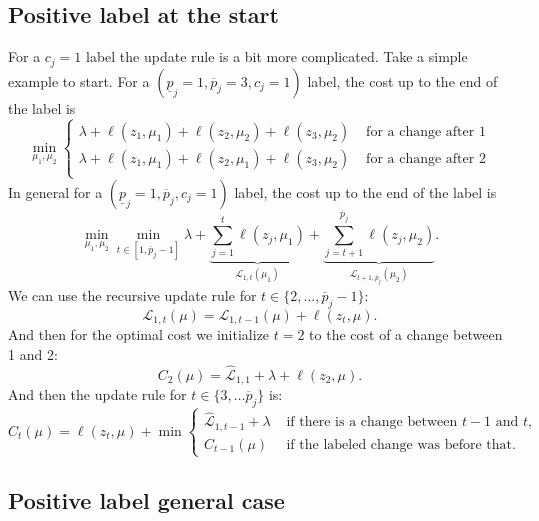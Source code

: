 \documentclass{article}
\begin{document}
\subsection{Positive label at the start}
For a $c_j=1$ label the update rule is a bit more complicated. Take a
simple example to start. For a
$(\underline p_j=1,\overline p_j=3,c_j=1)$ label, the cost up to the
end of the label is
\begin{equation}
  \label{eq:positive_cost}
  \min_{\mu_1, \mu_2}
  \begin{cases}
    \lambda+\ell(z_1,\mu_1) + \ell(z_2, \mu_2)+\ell(z_3, \mu_2) &\text{ for a
      change after 1}\\
    \lambda+\ell(z_1,\mu_1) + \ell(z_2, \mu_1)+\ell(z_3, \mu_2) &\text{ for a
      change after 2}\\
  \end{cases}
\end{equation}
In general for a
$(\underline p_j=1,\overline p_j,c_j=1)$ label, the cost up to the end
of the label is
\begin{equation}
  \label{eq:positive_cost}
  \min_{\mu_1, \mu_2}
  \min_{t\in[1, \overline p_j-1]}
\lambda+
  \underbrace{
    \sum_{j=1}^t \ell(z_j, \mu_1)
  }_{\mathcal L_{1,t}(\mu_1)}+
  \underbrace{
    \sum_{j=t+1}^{\overline p_j}\ell(z_j, \mu_2)
  }_{\mathcal L_{t+1,\overline p_j}(\mu_2)}.
\end{equation}
We can use the recursive update rule for $t\in\{2,\dots, \overline p_j-1\}$:
\begin{equation}
  \mathcal L_{1,t}(\mu) = \mathcal L_{1,t-1}(\mu) +\ell(z_t , \mu).
\end{equation}
And then for the optimal cost we initialize $t=2$ to the cost of a
change between 1 and 2:
\begin{equation}
  C_2(\mu)=\mathcal{\hat L}_{1,1}+\lambda+\ell(z_2,\mu).
\end{equation}
And then
the update rule for
$t\in\{3,\dots \overline p_j\}$ is:
\begin{equation}
  \label{eq:positive_update}
  C_t(\mu)=\ell(z_t, \mu) + \min
  \begin{cases}
\mathcal{\hat L}_{1, t-1}+\lambda &\text{ if there is a change between $t-1$ and $t$,}\\
C_{t-1}(\mu) & \text{ if the labeled change was before that.}
  \end{cases}
\end{equation}

\subsection{Positive label general case}
\end{document}
